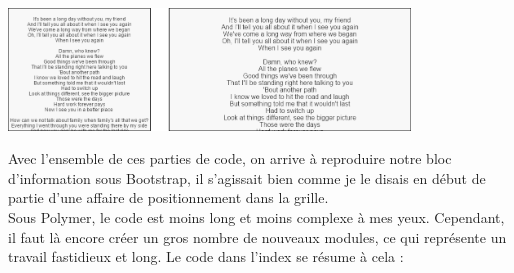 \documentclass{article}
\begin{document}
\begin{center}
\vspace{0.5cm}
\includegraphics[width=0.8\textwidth]{textes}
\vspace{0.5cm}\\
\end{center}
Avec l'ensemble de ces parties de code, on arrive \`a reproduire notre bloc d'information sous Bootstrap, il s'agissait bien comme je le disais en d\'ebut de partie d'une affaire de positionnement dans la grille.\\
Sous Polymer, le code est moins long et moins complexe \`a mes yeux. Cependant, il faut l\`a encore cr\'eer un gros nombre de nouveaux modules, ce qui repr\'esente un travail fastidieux et long. Le code dans l'index se r\'esume \`a cela :
\vspace{0.5cm}\\
\end{document}
